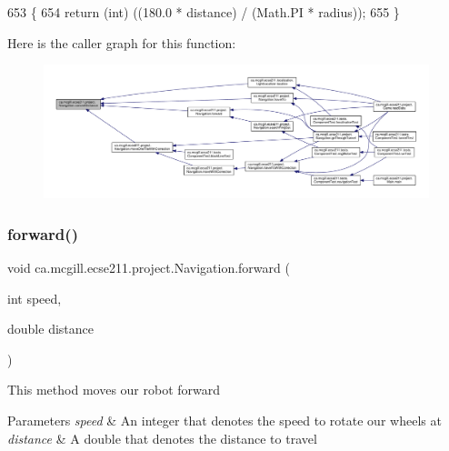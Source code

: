 \begin{DoxyCode}
653                                                                     \{
654     \textcolor{keywordflow}{return} (\textcolor{keywordtype}{int}) ((180.0 * distance) / (Math.PI * radius));
655   \}
\end{DoxyCode}
Here is the caller graph for this function\+:\nopagebreak
\begin{figure}[H]
\begin{center}
\leavevmode
\includegraphics[width=350pt]{classca_1_1mcgill_1_1ecse211_1_1project_1_1_navigation_ac9e260bcd619ffa4820d7d0de7ea1c12_icgraph}
\end{center}
\end{figure}
\mbox{\label{classca_1_1mcgill_1_1ecse211_1_1project_1_1_navigation_a7c66610c5b7496ddb35d342ab2cd3f08}} 
\subsubsection{\texorpdfstring{forward()}{forward()}}
{\footnotesize\ttfamily void ca.\+mcgill.\+ecse211.\+project.\+Navigation.\+forward (\begin{DoxyParamCaption}\item[{int}]{speed,  }\item[{double}]{distance }\end{DoxyParamCaption})}

This method moves our robot forward


\begin{DoxyParams}{Parameters}
{\em speed} & An integer that denotes the speed to rotate our wheels at \\
\hline
{\em distance} & A double that denotes the distance to travel \\
\hline
\end{DoxyParams}


